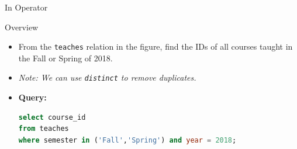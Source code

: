 \documentclass[aspectratio=169, xcolor=dvipsnames]{beamer}
\begin{document}
\begin{frame}[fragile]{In Operator}
    \begin{block}{Overview}
        \begin{itemize}[<+->]
            \item From the \texttt{teaches} relation in the figure, find the IDs of all courses taught in the Fall or Spring of 2018.
            \item \emph{Note: We can use \texttt{distinct} to remove duplicates.}
            \item \textbf{Query:}
            \begin{lstlisting}[language=SQL]
select course_id 
from teaches 
where semester in ('Fall','Spring') and year = 2018;
            \end{lstlisting}
        \end{itemize}
    \end{block}
\end{frame}
\end{document}
